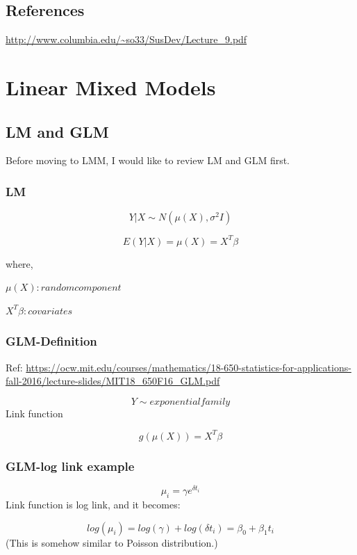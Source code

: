 \documentclass[]{book}
\begin{document}
\section{References}\label{references}

\url{http://www.columbia.edu/~so33/SusDev/Lecture_9.pdf}

\chapter{Linear Mixed Models}\label{linear-mixed-models}

\section{LM and GLM}\label{lm-and-glm}

Before moving to LMM, I would like to review LM and GLM first.

\subsection{LM}\label{lm}

\[Y|X \sim N(\mu(X),\sigma^2 I)\]

\[E(Y|X)=\mu(X)=X^T \beta\]

where,

\(\mu(X): random component\)

\(X^T \beta: covariates\)

\subsection{GLM-Definition}\label{glm-definition}

Ref:
\url{https://ocw.mit.edu/courses/mathematics/18-650-statistics-for-applications-fall-2016/lecture-slides/MIT18_650F16_GLM.pdf}

\[Y \sim exponential family\] Link function

\[g(\mu(X))=X^T \beta\]

\subsection{GLM-log link example}\label{glm-log-link-example}

\[\mu_i = \gamma e^{\delta t_i}\] Link function is log link, and it
becomes:

\[log(\mu_i) = log(\gamma) + log(\delta t_i)=\beta_0+\beta_1 t_i\] (This
is somehow similar to Poisson distribution.)
\end{document}
